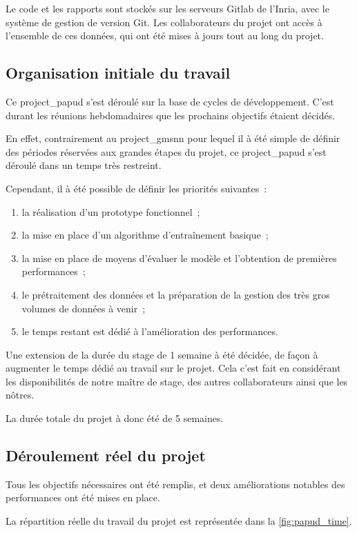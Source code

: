 Le code et les rapports sont stockés sur les serveurs Gitlab de l'Inria, avec le système de gestion de version Git. Les collaborateurs du projet ont accès à l'ensemble de ces données, qui ont été mises à jours tout au long du projet.

\subsection{Organisation initiale du travail}
Ce \gls{project_papud} s'est déroulé sur la base de cycles de développement.
C'est durant les réunions hebdomadaires que les prochains objectifs étaient décidés.

En effet, contrairement au \gls{project_gmsnn} pour lequel il à été simple de définir des périodes réservées aux grandes étapes du projet, ce \gls{project_papud} s'est déroulé dans un temps très restreint.

Cependant, il à été possible de définir les priorités suivantes~:
\begin{enumerate}
	\item la réalisation d'un prototype fonctionnel~;
	\item la mise en place d'un algorithme d'entraînement basique~;
	\item la mise en place de moyens d'évaluer le modèle et l'obtention de premières performances~;
	\item le prétraitement des données et la préparation de la gestion des très gros volumes de données à venir~;
	\item le temps restant est dédié à l'amélioration des performances.
\end{enumerate}
\hspace{1em}

Une extension de la durée du stage de 1 semaine à été décidée, de façon à augmenter le temps dédié au travail sur le projet.
Cela c'est fait en considérant les disponibilités de notre maître de stage, des autres collaborateurs ainsi que les nôtres.

La durée totale du projet à donc été de 5 semaines.

\subsection{Déroulement réel du projet}
Tous les objectifs nécessaires ont été remplis, et deux améliorations notables des performances ont été mises en place.

La répartition réelle du travail du projet est représentée dans la \autoref{fig:papud_time}.

